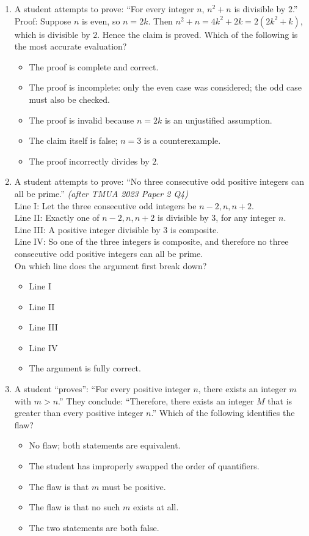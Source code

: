 \documentclass[11pt,a4paper]{article}
\begin{document}
\begin{enumerate}
\item A student attempts to prove: ``For every integer $n$, $n^2+n$ is divisible by $2$.'' Proof: Suppose $n$ is even, so $n=2k$. Then $n^2+n=4k^2+2k=2(2k^2+k)$, which is divisible by $2$. Hence the claim is proved. Which of the following is the most accurate evaluation?
\begin{itemize}
\item[A)] The proof is complete and correct.
\item[B)] The proof is incomplete: only the even case was considered; the odd case must also be checked.
\item[C)] The proof is invalid because $n=2k$ is an unjustified assumption.
\item[D)] The claim itself is false; $n=3$ is a counterexample.
\item[E)] The proof incorrectly divides by $2$.
\end{itemize}

\item A student attempts to prove: ``No three consecutive odd positive integers can all be prime.'' \textit{\small(after TMUA 2023 Paper 2 Q4)}\\
Line I: Let the three consecutive odd integers be $n-2,n,n+2$.\\
Line II: Exactly one of $n-2,n,n+2$ is divisible by $3$, for any integer $n$.\\
Line III: A positive integer divisible by $3$ is composite.\\
Line IV: So one of the three integers is composite, and therefore no three consecutive odd positive integers can all be prime.\\
On which line does the argument first break down?
\begin{itemize}
\item[A)] Line I
\item[B)] Line II
\item[C)] Line III
\item[D)] Line IV
\item[E)] The argument is fully correct.
\end{itemize}

\item A student ``proves'': ``For every positive integer $n$, there exists an integer $m$ with $m>n$.'' They conclude: ``Therefore, there exists an integer $M$ that is greater than every positive integer $n$.'' Which of the following identifies the flaw?
\begin{itemize}
\item[A)] No flaw; both statements are equivalent.
\item[B)] The student has improperly swapped the order of quantifiers.
\item[C)] The flaw is that $m$ must be positive.
\item[D)] The flaw is that no such $m$ exists at all.
\item[E)] The two statements are both false.
\end{itemize}


\end{enumerate}
\end{document}
